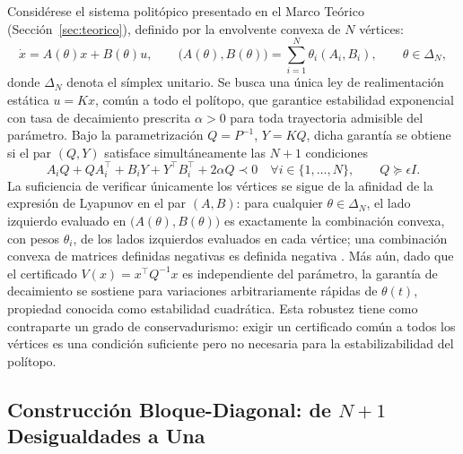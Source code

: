 Considérese el sistema politópico presentado en el Marco Teórico 
(Sección~\ref{sec:teorico}), definido por la envolvente convexa de $N$ vértices:
\begin{equation}
    \dot{x} = A(\theta)x + B(\theta)u, \qquad 
    \big(A(\theta), B(\theta)\big) = \sum_{i=1}^{N} \theta_i (A_i, B_i), \qquad 
    \theta \in \Delta_N,
    \label{eq:sistema_politopico}
\end{equation}
donde $\Delta_N$ denota el símplex unitario. Se busca una única ley de realimentación 
estática $u = Kx$, común a todo el polítopo, que garantice estabilidad exponencial con 
tasa de decaimiento prescrita $\alpha > 0$ para toda trayectoria admisible del 
parámetro. Bajo la parametrización $Q = P^{-1}$, $Y = KQ$, dicha garantía se obtiene 
si el par $(Q, Y)$ satisface simultáneamente las $N+1$ condiciones
\begin{equation}
    A_i Q + Q A_i^\top + B_i Y + Y^\top B_i^\top + 2\alpha Q \prec 0 
    \quad \forall i \in \{1, \dots, N\}, 
    \qquad Q \succeq \epsilon I.
    \label{eq:lmis_vertices}
\end{equation}
La suficiencia de verificar únicamente los vértices se sigue de la afinidad de la 
expresión de Lyapunov en el par $(A, B)$: para cualquier $\theta \in \Delta_N$, el 
lado izquierdo evaluado en $\big(A(\theta), B(\theta)\big)$ es exactamente la 
combinación convexa, con pesos $\theta_i$, de los lados izquierdos evaluados en cada 
vértice; una combinación convexa de matrices definidas negativas es definida negativa 
\cite{boyd1994lmi}. Más aún, dado que el certificado $V(x) = x^\top Q^{-1} x$ es 
independiente del parámetro, la garantía de decaimiento se sostiene para variaciones 
arbitrariamente rápidas de $\theta(t)$, propiedad conocida como estabilidad 
cuadrática. Esta robustez tiene como contraparte un grado de conservadurismo: exigir 
un certificado común a todos los vértices es una condición suficiente pero no 
necesaria para la estabilizabilidad del polítopo.






\subsection{Construcción Bloque-Diagonal: de $N+1$ Desigualdades a Una}
\label{subsec:construccion_bloques}


